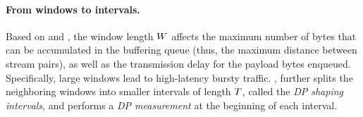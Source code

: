 \paragraph{From windows to intervals.}
{Based on  and ,}
the window length $W$ affects the maximum number of bytes that can be
accumulated in the buffering queue (thus, the maximum distance between stream
pairs), as well as the transmission delay for the payload bytes enqueued.
Specifically, large windows lead to high-latency bursty traffic.
,
{\sys} further splits the neighboring windows into smaller intervals of length
$T$, called the {\em DP shaping intervals}, and performs a {\em DP
measurement} at the beginning of each interval.
%
\fi


